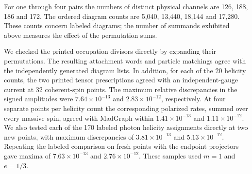 For one through four pairs the numbers of distinct physical channels
are 126, 188, 186 and 172. The ordered diagram counts are 5,040, 13,440,
18,144 and 17,280. These counts concern labeled diagrams; the number
of summands exhibited above measures the effect of the permutation sums.

We checked the printed occupation divisors directly by expanding their
permutations. The resulting attachment words and particle matchings
agree with the independently generated diagram lists. In addition, for
each of the 20 helicity counts, the two printed tensor prescriptions
agreed with an independent-gauge current at 32 coherent-spin points.
The maximum relative discrepancies in the signed amplitudes were
$7.64\times10^{-13}$ and $2.83\times10^{-12}$, respectively. At four
separate points per helicity count the corresponding polarized rates, summed
over every massive spin, agreed with MadGraph within $1.41\times10^{-13}$
and $1.11\times10^{-12}$. We also tested each of the 170 labeled photon
helicity assignments directly at two new points, with maximum discrepancies
of $3.81\times10^{-13}$ and $5.13\times10^{-12}$. Repeating the labeled
comparison on fresh points with the endpoint projectors gave maxima
of $7.63\times10^{-13}$ and $2.76\times10^{-12}$. These samples used
$m=1$ and $e=1/3$.

